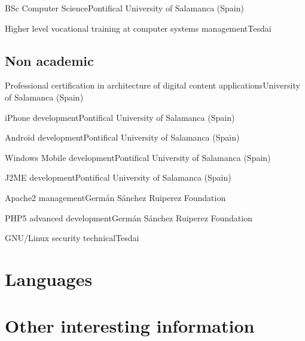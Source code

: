 \documentclass[10pt, a4paper]{moderncv}
\begin{document}
{BSc Computer Science}{Pontifical University of Salamanca (Spain)}{}{}{}

{Higher level vocational training at computer systems management}{Tesdai}{}{}{}

\subsection{Non academic}
{Professional certification in architecture of digital content applications}{University of Salamanca (Spain)}{}{}{}

{iPhone development}{Pontifical University of Salamanca (Spain)}{}{}{}

{Android development}{Pontifical University of Salamanca (Spain)}{}{}{}

{Windows Mobile development}{Pontifical University of Salamanca (Spain)}{}{}{}

{J2ME development}{Pontifical University of Salamanca (Spain)}{}{}{}

{Apache2 management}{Germán Sánchez Ruiperez Foundation}{}{}{}

{PHP5 advanced development}{Germán Sánchez Ruiperez Foundation}{}{}{}

{GNU/Linux security technical}{Tesdai}{}{}{}

%
%

\section{Languages}

%
%

\section{Other interesting information}

\end{document}
